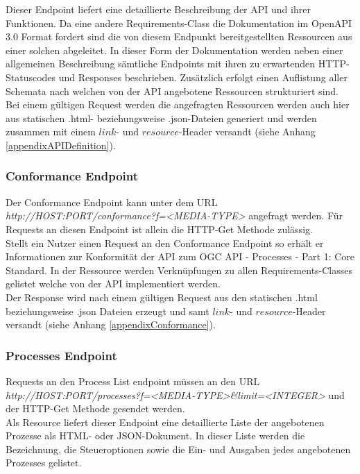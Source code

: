 Dieser Endpoint liefert eine detaillierte Beschreibung der API und ihrer Funktionen. Da eine andere Requirements-Class die Dokumentation im  OpenAPI 3.0 Format fordert sind 
die von diesem Endpunkt bereitgestellten Ressourcen aus einer solchen abgeleitet. In dieser Form der Dokumentation werden neben einer allgemeinen Beschreibung sämtliche Endpoints mit ihren zu erwartenden HTTP-Statuscodes und 
Responses beschrieben. Zusätzlich erfolgt einen Auflistung aller Schemata nach welchen von der API angebotene Ressourcen strukturiert sind. \\

Bei einem gültigen Request werden die angefragten Ressourcen werden auch hier aus statischen .html- beziehungsweise .json-Dateien generiert und werden zusammen mit 
einem $link$- und $resource$-Header versandt (siehe Anhang \ref{appendixAPIDefinition}).

\subsubsection{Conformance Endpoint}
Der Conformance Endpoint kann unter dem URL \textit{http://HOST:PORT/conformance?f=<MEDIA-TYPE>} angefragt werden. Für Requests an diesen Endpoint ist allein die HTTP-Get 
Methode zulässig.\\

Stellt ein Nutzer einen Request an den Conformance Endpoint so erhält er Informationen zur Konformität der API zum OGC API - Processes - Part 1: Core Standard. 
In der Ressource werden Verknüpfungen zu allen Requirements-Classes gelistet welche von der API implementiert werden.\\

Der Response wird nach einem gültigen Request aus den statischen .html beziehungsweise .json Dateien erzeugt und samt $link$- und $resource$-Header 
versandt (siehe Anhang \ref{appendixConformance}). 

\subsubsection{Processes Endpoint}
Requests an den Process List endpoint müssen an den URL \textit{http://HOST:PORT/processes?f=<MEDIA-TYPE>\&limit=<INTEGER>} und der HTTP-Get Methode gesendet werden.\\

Als Resource liefert dieser Endpoint eine detaillierte Liste der angebotenen Prozesse als HTML- oder JSON-Dokument. In dieser Liste werden die Bezeichnung, 
die Steueroptionen sowie die Ein- und Ausgaben jedes angebotenen Prozesses gelistet.\\

